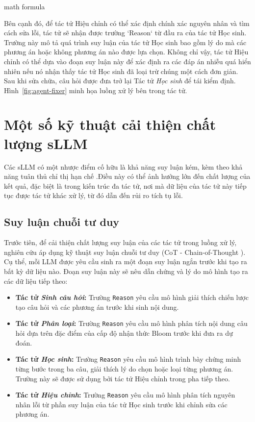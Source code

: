 {math formula}

Bên cạnh đó, để tác tử {Hiệu chỉnh} có thể xác định chính xác nguyên nhân và tìm cách sửa lỗi, tác tử  sẽ nhận được trường `Reason` từ đầu ra của tác tử {Học sinh}. Trường này mô tả quá trình suy luận của tác tử {Học sinh} bao gồm lý do mà các phương án hoặc không phương án nào được lựa chọn. Không chỉ vậy, tác tử {Hiệu chỉnh} có thể dựa vào đoạn suy luận này để xác định ra các đáp án nhiễu quá hiển nhiên nếu nó nhận thấy tác tử {Học sinh} đã loại trừ chúng một cách đơn giản. Sau khi sửa chữa, câu hỏi được đưa trở lại Tác tử \textit{Học sinh} để tái kiểm định. Hình~\ref{fig:agent-fixer} minh họa luồng xử lý bên trong tác tử.

\section{Một số kỹ thuật cải thiện chất lượng sLLM}
Các sLLM có một nhược điểm cố hữu là khả năng suy luận kém, kèm theo khả năng tuân thủ chỉ thị hạn chế .Điều này có thể ảnh hưởng lớn đến chất lượng của kết quả, đặc biệt là trong kiến trúc đa tác tử, nơi mà dữ liệu của tác tử này tiếp tục được tác tử khác xử lý, từ đó dẫn đến rủi ro tích tụ lỗi.

\subsection{Suy luận chuỗi tư duy}
Trước tiên, để cải thiện chất lượng suy luận của các tác tử trong luồng xử lý, nghiên cứu áp dụng kỹ thuật suy luận chuỗi tư duy (CoT - Chain-of-Thought \cite{wei2022chain}). Cụ thể, mỗi LLM được yêu cầu sinh ra một đoạn suy luận ngắn trước khi tạo ra bất kỳ dữ liệu nào. Đoạn suy luận này sẽ nêu dẫn chứng và lý do mô hình tạo ra các dữ liệu tiếp theo:

\begin{itemize}
    \item \textbf{Tác tử \textit{Sinh câu hỏi}:} Trường \texttt{Reason} yêu cầu mô hình giải thích chiến lược tạo câu hỏi và các phương án trước khi sinh nội dung.
    \item \textbf{Tác tử \textit{Phân loại}:} Trường \texttt{Reason} yêu cầu mô hình phân tích nội dung câu hỏi dựa trên đặc điểm của cấp độ nhận thức Bloom trước khi đưa ra dự đoán.
    \item \textbf{Tác tử \textit{Học sinh}:} Trường \texttt{Reason} yêu cầu mô hình trình bày chứng minh từng bước trong ba câu, giải thích lý do chọn hoặc loại từng phương án. Trường này sẽ được sử dụng bởi tác tử {Hiệu chỉnh} trong pha tiếp theo.
    \item \textbf{Tác tử \textit{Hiệu chỉnh}:} Trường \texttt{Reason} yêu cầu mô hình phân tích nguyên nhân lỗi từ phần suy luận của tác tử {Học sinh} trước khi chỉnh sửa các phương án.
\end{itemize}

